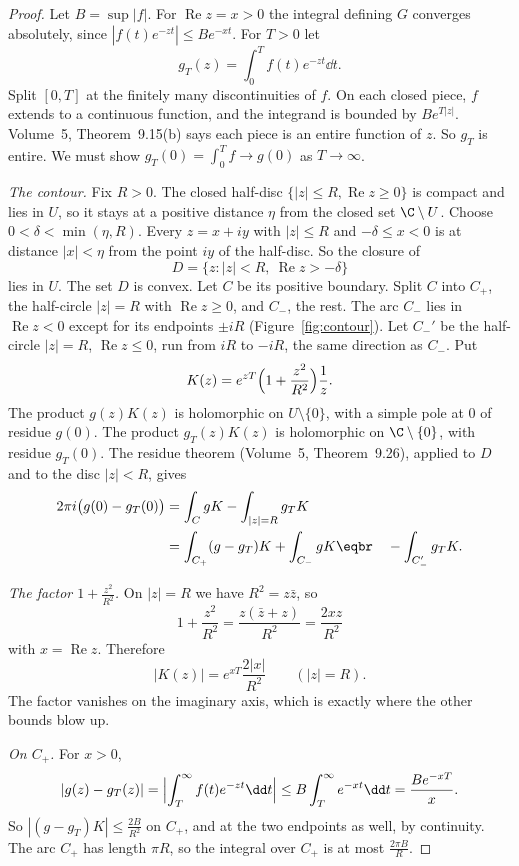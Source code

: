 \begin{proof}
Let $B=\sup|f|$. For $\operatorname{Re}z=x>0$ the integral defining $G$ converges absolutely, since $|f(t)e^{-zt}|\le Be^{-xt}$. For $T>0$ let
\[
g_T(z)=\int_0^Tf(t)e^{-zt}\dd t.
\]
Split $[0,T]$ at the finitely many discontinuities of $f$. On each closed piece, $f$ extends to a continuous function, and the integrand is bounded by $Be^{T|z|}$. Volume~5, Theorem~9.15(b) says each piece is an entire function of $z$. So $g_T$ is entire. We must show $g_T(0)=\int_0^Tf\to g(0)$ as $T\to\infty$.

\emph{The contour.} Fix $R>0$. The closed half-disc $\{|z|\le R,\operatorname{Re}z\ge0\}$ is compact and lies in $U$, so it stays at a positive distance $\eta$ from the closed set $\C\setminus U$. Choose $0<\delta<\min(\eta,R)$. Every $z=x+iy$ with $|z|\le R$ and $-\delta\le x<0$ is at distance $|x|<\eta$ from the point $iy$ of the half-disc. So the closure of
\[
D=\{z:|z|<R,\ \operatorname{Re}z>-\delta\}
\]
lies in $U$. The set $D$ is convex. Let $C$ be its positive boundary. Split $C$ into $C_+$, the half-circle $|z|=R$ with $\operatorname{Re}z\ge0$, and $C_-$, the rest. The arc $C_-$ lies in $\operatorname{Re}z<0$ except for its endpoints $\pm iR$ (Figure~\ref{fig:contour}). Let $C_-'$ be the half-circle $|z|=R$, $\operatorname{Re}z\le0$, run from $iR$ to $-iR$, the same direction as $C_-$. Put
\[
K(z)=e^{zT}\Bigl(1+\frac{z^2}{R^2}\Bigr)\frac1z.
\]
The product $g(z)K(z)$ is holomorphic on $U\setminus\{0\}$, with a simple pole at $0$ of residue $g(0)$. The product $g_T(z)K(z)$ is holomorphic on $\C\setminus\{0\}$, with residue $g_T(0)$. The residue theorem (Volume~5, Theorem~9.26), applied to $D$ and to the disc $|z|<R$, gives
\[
\begin{aligned}2\pi i\bigl(g(0)-g_T(0)\bigr)&=\int_CgK-\int_{|z|=R}g_TK\\&=\int_{C_+}(g-g_T)K+\int_{C_-}gK\eqbr\quad-\int_{C_-'}g_TK.\end{aligned}
\]

\emph{The factor $1+\frac{z^2}{R^2}$.} On $|z|=R$ we have $R^2=z\bar z$, so
\[
1+\frac{z^2}{R^2}=\frac{z(\bar z+z)}{R^2}=\frac{2xz}{R^2}
\]
with $x=\operatorname{Re}z$. Therefore
\[
|K(z)|=e^{xT}\frac{2|x|}{R^2}\qquad(|z|=R).
\]
The factor vanishes on the imaginary axis, which is exactly where the other bounds blow up.

\emph{On $C_+$.} For $x>0$,
\[
|g(z)-g_T(z)|=\Bigl|\int_T^\infty f(t)e^{-zt}\dd t\Bigr|\le B\int_T^\infty e^{-xt}\dd t=\frac{Be^{-xT}}x.
\]
So $|(g-g_T)K|\le\frac{2B}{R^2}$ on $C_+$, and at the two endpoints as well, by continuity. The arc $C_+$ has length $\pi R$, so the integral over $C_+$ is at most $\frac{2\pi B}R$.


\end{proof}
